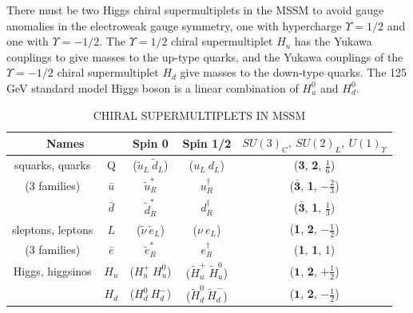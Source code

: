 There must be two Higgs chiral supermultiplets in the MSSM to avoid gauge anomalies in the electroweak gauge symmetry, one with hypercharge $\Upsilon = 1/2$ and one with $\Upsilon = -1/2$. The $\Upsilon = 1/2$ chiral supermultiplet $H_u$ has the Yukawa couplings to give masses to the up-type quarks, and the Yukawa couplings of the $\Upsilon = -1/2$ chiral supermultiplet $H_d$ give masses to the down-type quarks. The 125 GeV standard model Higgs boson is a linear combination of $H_u^0$ and $H_d^0$.


\begin{table}[ht]
    \caption{CHIRAL SUPERMULTIPLETS IN MSSM}
    \centering
    \begin{tabular}{|c|c|c|c|c|}
    \hline
    \hline
    \multicolumn{2}{|c|}{Names} & Spin 0 & Spin 1/2 &$SU(3)_C,~SU(2)_L,~U(1)_\Upsilon $\\
  	  \hline
           \hline    
squarks, quarks  & Q & ($\tilde{u}_L~\tilde{d}_L$) & ($u_L~d_L$)  & (\textbf{3}, \textbf{2}, $\frac{1}{6}$) \\
(3 families) & $\bar{u}$ & $\tilde{u}_R^\ast$ & $u_R^\dagger$ & ($\bar{\textbf{3}}$, \textbf{1}, $-\frac{2}{3}$) \\
                   & $\bar{d}$ & $\tilde{d}_R^*$     & $d_R^\dagger$ & ($\bar{\textbf{3}}$, \textbf{1}, $\frac{1}{3}$) \\
                   \hline
sleptons, leptons  & $L$ & ($\tilde{\nu}~\tilde{e}_L$) & ($\nu~e_L$)      &  (\textbf{1}, \textbf{2}, $-\frac{1}{2}$) \\
(3 families) & $\bar{e}$ & $\tilde{e}_R^\ast$  & $e_R^\dagger$ &  (\textbf{1}, \textbf{1}, 1) \\
\hline
Higgs, higgsinos & $H_u$  & ($H_u^+ ~ H_u^0$) & ($\tilde{H}_u^+ ~ \tilde{H}_u^0$) & ($\textbf{1}$, \textbf{2}, $+\frac{1}{2}$) \\
                           & $H_d$  & ($H_d^0 ~ H_d^-$) & ($\tilde{H}_d^0 ~ \tilde{H}_d^-$) & ($\textbf{1}$, \textbf{2}, $-\frac{1}{2}$) \\
           \hline
           \hline
    \end{tabular}
    \label{tab:SUSY_fermions}
\end{table}

